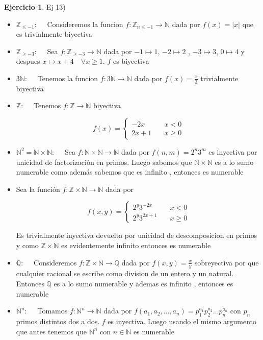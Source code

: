 \documentclass[12pt]{article}
\newcommand{\Q}{\mathbb{Q}}
\newcommand{\Z}{\mathbb{Z}}
\newcommand{\N}{\mathbb{N}}
\newcommand{\ra}{\rightarrow}
\theoremstyle{definition}
\newtheorem{ej}{Ejercicio}
\begin{document}
\begin{ej}
 \noindent Ej 13) 

\begin{itemize}
  \item $\Z_{\leq -1}: \quad$ Consideremos la funcion $f : \Z_{n \leq -1} \ra \N$ dada por $f(x) = |x|$ que es trivialmente biyectiva

  \item $\Z_{\geq -3}: \quad$ Sea $f: \Z_{\geq -3} \ra \N$ dada por $-1 \mapsto 1$, $-2 \mapsto 2$ , $-3 \mapsto 3$, $0 \mapsto 4$ y despues $x \mapsto x + 4 \quad \forall x \geq 1$. $f$ es biyectiva

  \item $3 \N: \quad$ Tenemos la funcion $f:3 \N \ra \N$ dada por $f(x) = \frac{x}{3}$ trivialmente biyectiva
  
  \item $\Z: \quad $ Tenemos $f: \Z \ra \N$ biyectiva

$$
f(x) = \left\{
        \begin{array}{ll}
	  -2x  & \quad x < 0 \\
	2x +1  & \quad x \geq 0 
        \end{array}
    \right.
$$

\item $\N^{2} = \N \times \N: \quad$ Sea $f : \N \times \N \ra \N$ dada por $f(n,m) =2^n3^m$ es inyectiva por unicidad de  factorización en primos. Luego sabemos que $\N \times \N$ es a lo sumo numerable como además sabemos que es infinito , entonces es numerable

\item  Sea la función $f: \Z \times \N \ra \N$ dada por 

$$
f(x,y) = \left\{
        \begin{array}{ll}
	  2^{y}3^{-2x}  & \quad x < 0 \\
	  2^{y}3^{2x + 1}  & \quad x \geq 0 
        \end{array}
    \right.
$$

Es trivialmente inyectiva devuelta por unicidad de descomposicion en primos y como $\Z \times \N$ es evidentemente infinito entonces es numerable
  
\item $\Q: \quad $ Consideremos $f: \Z \times \N \ra \Q$ dada por $f(x,y) = \frac{x}{y}$ sobreyectiva por que cualquier racional se escribe como division de un entero y un natural. Entonces $\Q$ es a lo sumo numerable y ademas es infinito , entonces es numerable
  
 \item $\N^{n}: \quad$ Tomamos $f: \N^{n} \ra \N$ dada por $f(a_{1},a_{2}, \dots , a_{n}) = p_{1}^{a_{1}}p_{2}^{a_{2}} \dots p_{n}^{a_{n}}$  con $p_{n}$ primos distintos dos a dos. $f$ es inyectiva. Luego usando el mismo argumento que antes tenemos que $\N^n$ con $n \in \N$ es numerable \\
\end{itemize}
\end{ej}
\end{document}
